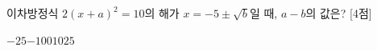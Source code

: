 이차방정식 $2(x+a)^2=10$의 해가 $x=-5\pm\sqrt{b}$일 때, $a-b$의 값은?  \mbox{[4점]}
\begin{choices32}{$-25$}{$-10$}{$0$}{$10$}{$25$}\end{choices32}
